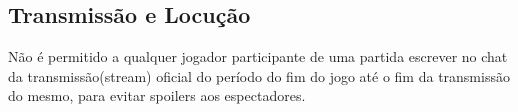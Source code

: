 \subsection{Transmissão e Locução}

Não é permitido a qualquer jogador participante de uma partida escrever no chat da transmissão(stream) oficial do período do fim do jogo até o fim da transmissão do mesmo, para evitar spoilers aos espectadores.
